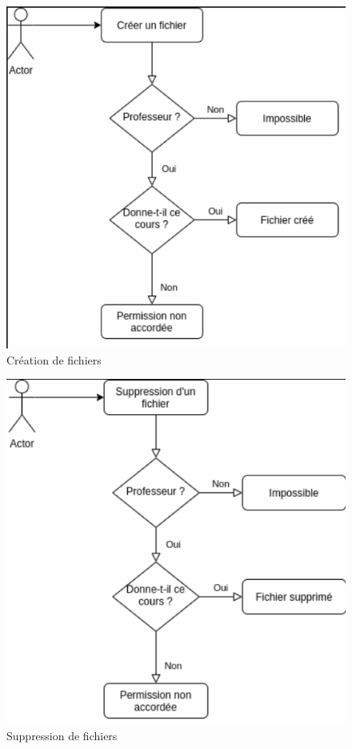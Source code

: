 \begin{figure}[H]
	\centering
	\includegraphics[scale=0.45]{images/create.png}
	\caption{Création de fichiers}
	\label{fig:create}
\end{figure}


\begin{figure}[H]
	\centering
	\includegraphics[scale=0.45]{images/delete.png}
	\caption{Suppression de fichiers}
	\label{fig:delete}
\end{figure}


